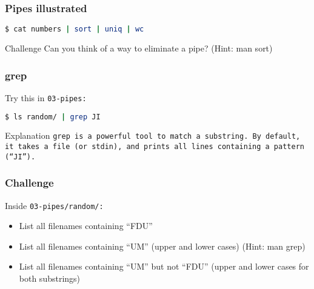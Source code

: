 \begin{frame}[fragile]
\frametitle{Pipes illustrated}
\begin{lstlisting}[language=bash]
$ cat numbers | sort | uniq | wc
\end{lstlisting}
\begin{figure}
    \centering
\end{figure}
\begin{block}{Challenge}
    Can you think of a way to eliminate a pipe? (Hint: man sort)
\end{block}
\end{frame}

\begin{frame}[fragile]
\frametitle{grep}
Try this in \tt{03-pipes}:
\begin{lstlisting}[language=bash]
$ ls random/ | grep JI
\end{lstlisting}
\pause
\begin{block}{Explanation}
    \tt{grep} is a powerful tool to match a substring. By default, it takes
    a file (or stdin), and prints all lines containing a pattern (``JI'').
\end{block}
\end{frame}

\begin{frame}
\frametitle{Challenge}
Inside \tt{03-pipes/random/}:
\begin{itemize}
    \item List all filenames containing ``FDU''
    \item List all filenames containing ``UM'' (upper and lower cases)
        (Hint: man grep)
    \item List all filenames containing ``UM'' but not ``FDU''
        (upper and lower cases for both substrings)
\end{itemize}
\end{frame}


